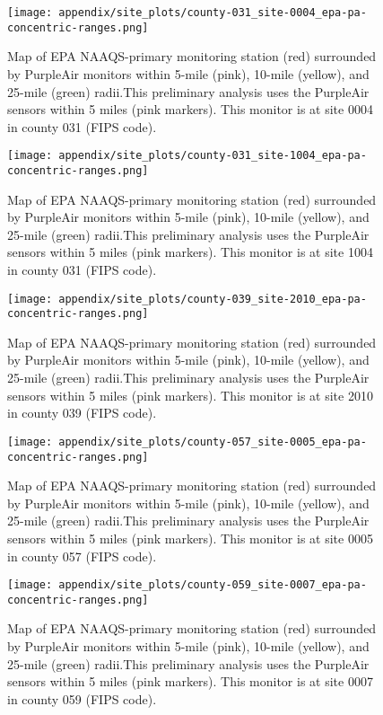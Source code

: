 \begin{figure}
\centering
\texttt{[image: appendix/site\_plots/county-031\_site-0004\_epa-pa-concentric-ranges.png]}
\caption{Map of EPA NAAQS-primary monitoring station (red) surrounded by PurpleAir monitors within 5-mile (pink), 10-mile (yellow), and 25-mile (green) radii.This preliminary analysis uses the PurpleAir sensors within 5 miles (pink markers). This monitor is at site 0004 in county 031 (FIPS code).}
\label{fig:concentric_purpleair_031-0004}
\end{figure}
\begin{figure}
\centering
\texttt{[image: appendix/site\_plots/county-031\_site-1004\_epa-pa-concentric-ranges.png]}
\caption{Map of EPA NAAQS-primary monitoring station (red) surrounded by PurpleAir monitors within 5-mile (pink), 10-mile (yellow), and 25-mile (green) radii.This preliminary analysis uses the PurpleAir sensors within 5 miles (pink markers). This monitor is at site 1004 in county 031 (FIPS code).}
\label{fig:concentric_purpleair_031-1004}
\end{figure}
\begin{figure}
\centering
\texttt{[image: appendix/site\_plots/county-039\_site-2010\_epa-pa-concentric-ranges.png]}
\caption{Map of EPA NAAQS-primary monitoring station (red) surrounded by PurpleAir monitors within 5-mile (pink), 10-mile (yellow), and 25-mile (green) radii.This preliminary analysis uses the PurpleAir sensors within 5 miles (pink markers). This monitor is at site 2010 in county 039 (FIPS code).}
\label{fig:concentric_purpleair_039-2010}
\end{figure}
\begin{figure}
\centering
\texttt{[image: appendix/site\_plots/county-057\_site-0005\_epa-pa-concentric-ranges.png]}
\caption{Map of EPA NAAQS-primary monitoring station (red) surrounded by PurpleAir monitors within 5-mile (pink), 10-mile (yellow), and 25-mile (green) radii.This preliminary analysis uses the PurpleAir sensors within 5 miles (pink markers). This monitor is at site 0005 in county 057 (FIPS code).}
\label{fig:concentric_purpleair_057-0005}
\end{figure}
\begin{figure}
\centering
\texttt{[image: appendix/site\_plots/county-059\_site-0007\_epa-pa-concentric-ranges.png]}
\caption{Map of EPA NAAQS-primary monitoring station (red) surrounded by PurpleAir monitors within 5-mile (pink), 10-mile (yellow), and 25-mile (green) radii.This preliminary analysis uses the PurpleAir sensors within 5 miles (pink markers). This monitor is at site 0007 in county 059 (FIPS code).}
\label{fig:concentric_purpleair_059-0007}
\end{figure}
